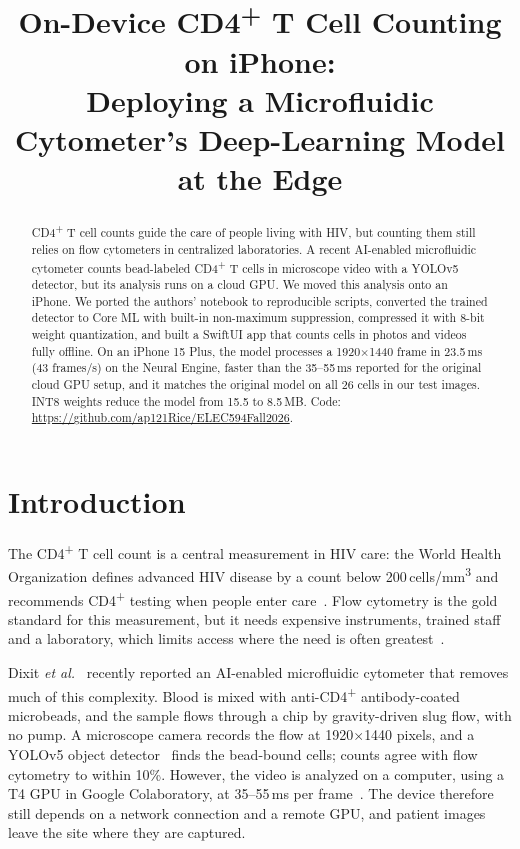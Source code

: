 \documentclass[conference]{IEEEtran}
\newcommand{\cdfour}{CD4\textsuperscript{+}}
\begin{document}
\title{On-Device \cdfour{} T Cell Counting on iPhone:\\Deploying a Microfluidic Cytometer's Deep-Learning Model at the Edge}

\author{
}

\maketitle

\begin{abstract}
\cdfour{} T cell counts guide the care of people living with HIV, but counting them still relies on flow cytometers in centralized laboratories. A recent AI-enabled microfluidic cytometer counts bead-labeled \cdfour{} T cells in microscope video with a YOLOv5 detector, but its analysis runs on a cloud GPU. We moved this analysis onto an iPhone. We ported the authors' notebook to reproducible scripts, converted the trained detector to Core ML with built-in non-maximum suppression, compressed it with 8-bit weight quantization, and built a SwiftUI app that counts cells in photos and videos fully offline. On an iPhone 15 Plus, the model processes a 1920$\times$1440 frame in 23.5\,ms (43 frames/s) on the Neural Engine, faster than the 35--55\,ms reported for the original cloud GPU setup, and it matches the original model on all 26 cells in our test images. INT8 weights reduce the model from 15.5 to 8.5\,MB. Code: \url{https://github.com/ap121Rice/ELEC594Fall2026}.
\end{abstract}

\section{Introduction}

The \cdfour{} T cell count is a central measurement in HIV care: the World Health Organization defines advanced HIV disease by a count below 200\,cells/mm\textsuperscript{3} and recommends \cdfour{} testing when people enter care~\cite{who2017}. Flow cytometry is the gold standard for this measurement, but it needs expensive instruments, trained staff and a laboratory, which limits access where the need is often greatest~\cite{dixit2025}.

Dixit \emph{et al.}~\cite{dixit2025} recently reported an AI-enabled microfluidic cytometer that removes much of this complexity. Blood is mixed with anti-\cdfour{} antibody-coated microbeads, and the sample flows through a chip by gravity-driven slug flow, with no pump. A microscope camera records the flow at 1920$\times$1440 pixels, and a YOLOv5 object detector~\cite{redmon2016,yolov5} finds the bead-bound cells; counts agree with flow cytometry to within 10\%. However, the video is analyzed on a computer, using a T4 GPU in Google Colaboratory, at 35--55\,ms per frame~\cite{dixit2025}. The device therefore still depends on a network connection and a remote GPU, and patient images leave the site where they are captured.
\end{document}
